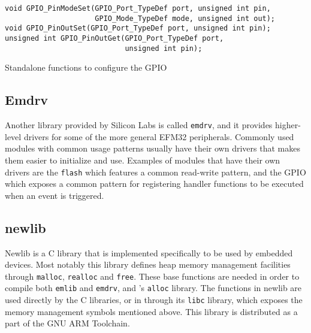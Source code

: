 \begin{listing}[H]
  \begin{verbatim}
void GPIO_PinModeSet(GPIO_Port_TypeDef port, unsigned int pin,
                     GPIO_Mode_TypeDef mode, unsigned int out);
void GPIO_PinOutSet(GPIO_Port_TypeDef port, unsigned int pin);
unsigned int GPIO_PinOutGet(GPIO_Port_TypeDef port,
                            unsigned int pin);
  \end{verbatim}
  \caption{Standalone functions to configure the GPIO}
  \label{lst:back:lib:gpio}
\end{listing}

\subsection{Emdrv}

Another library provided by Silicon Labs is called \texttt{emdrv}, and it provides higher-level drivers for some of the more general EFM32 peripherals.
Commonly used modules with common usage patterns usually have their own drivers that makes them easier to initialize and use.
Examples of modules that have their own drivers are the \texttt{flash} which features a common read-write pattern, and the GPIO which exposes a common pattern for registering handler functions to be executed when an event is triggered.

\subsection{newlib}

Newlib is a C library that is implemented specifically to be used by embedded devices.
Most notably this library defines heap memory management facilities through \texttt{malloc}, \texttt{realloc} and \texttt{free}.
These base functions are needed in order to compile both \texttt{emlib} and \texttt{emdrv}, and \rust's \texttt{alloc} library.
The functions in newlib are used directly by the C libraries, or in \rust through its \texttt{libc} library, which exposes the memory management symbols mentioned above.
This library is distributed as a part of the GNU ARM Toolchain.
